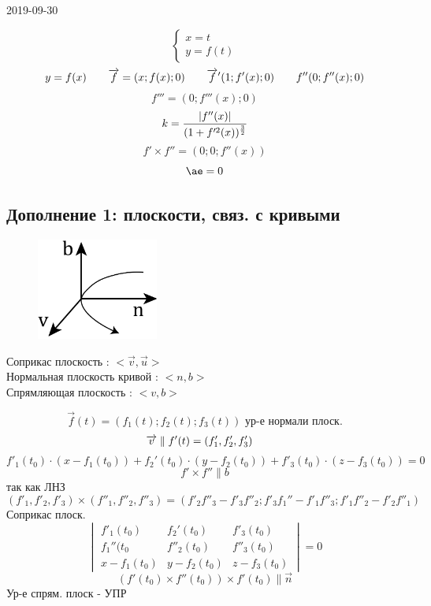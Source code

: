 \documentclass[main]{subfiles}
\begin{document}
\begin{lect} {2019-09-30}
		\begin{Example}
			\[\begin{cases}
					x = t\\
					y = f(t)
			\end{cases}\]
			\[y = f(x) \quad\quad \overrightarrow{f} = (x; f(x); 0) \quad\quad \overrightarrow{f}'(1; f'(x); 0) \quad\quad f''(0; f''(x); 0)\]
			\[f'''= (0; f'''(x); 0)\]
			\[k = \frac{\left|f''(x)\right|}{(1 + f'^2(x))^{\frac{3}{2}} }\]
			\[f' \times f'' = (0; 0; f''(x))\]
			\[\ae = 0\]
		\end{Example}

\subsection{Дополнение 1: плоскости, связ. с кривыми}

		\begin{definition}
			\begin{figure}[H]
			    \includegraphics[width=4cm]{pics/4_1.png}
			    \centering
			\end{figure}

		    Соприкас плоскость : $<\vec{v}, \vec{u}>$\\
			Нормальная плоскость кривой : $<n, b>$\\
			Спрямляющая плоскость : $<v, b>$
		\end{definition}

		\begin{Theorem}
			\[\vec{f}(t) = (f_1(t); f_2(t); f_3(t)) \text{ ур-е нормали плоск.}\]
			\[\overrightarrow{v} \parallel f'(t) = (f_1', f_2', f_3') \quad \]
            \[f'_1(t_0) \cdot(x - f_1(t_0)) +
			f_2'(t_0) \cdot (y - f_2(t_0)) + f'_3(t_0) \cdot (z - f_3(t_0)) = 0\]
			\[f' \times f'' \parallel b\]
			так как ЛНЗ
			\[(f'_1, f'_2, f'_3) \times (f''_1, f''_2, f''_3) = (f'_2 f''_3 - f'_3 f''_2;
			f'_3 f_1'' - f'_1 f''_3; f'_1 f''_2 - f'_2 f''_1)\]
			Соприкас плоск.
			\[\begin{vmatrix}
				f'_1(t_0) & f_2'(t_0) & f'_3(t_0)\\
				f_1''(t_0 & f''_2(t_0) & f''_3(t_0)\\
				x - f_1(t_0) & y - f_2(t_0) & z - f_3(t_0)
			\end{vmatrix} = 0\]
			\[(f'(t_0) \times f''(t_0)) \times f'(t_0) \parallel \vec{n}\]
			Ур-е спрям. плоск - УПР
		\end{Theorem}


\end{lect}
\end{document}
